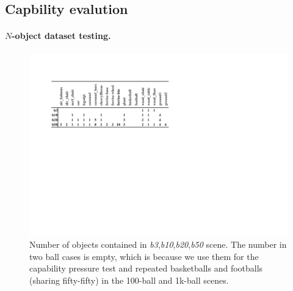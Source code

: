 \documentclass[letterpaper]{article} %
\begin{document}
\subsection{Capbility evalution}
\paragraph{$N$-object dataset testing.}
\begin{figure}[tbp]
    \centering
    \includegraphics[width=\linewidth]{figure/bx_table.pdf}
    \caption{Number of objects contained in \textit{b3},\textit{b10},\textit{b20},\textit{b50} scene. The number in two ball cases is empty, which is because we use them for the capability pressure test and repeated basketballs and footballs (sharing fifty-fifty) in the 100-ball and 1k-ball scenes.}
    \label{fig:bx_table}
\end{figure}
\end{document}
